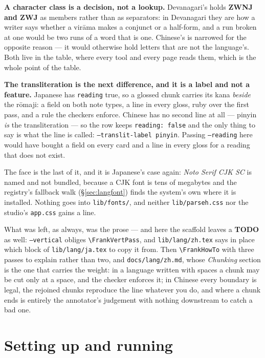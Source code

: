 \documentclass[11pt,oneside]{report}
\newcommand{\file}[1]{\texttt{#1}}
\begin{document}
\begin{goodbox}
\textbf{A character class is a decision, not a lookup.} Devanagari's holds
\textbf{ZWNJ and ZWJ} as members rather than as separators: in Devanagari
they are how a writer says whether a vir\=ama makes a conjunct or a
half-form, and a run broken at one would be two runs of a word that is one.
Chinese's is narrowed for the opposite reason --- it would otherwise hold
letters that are not the language's. Both live in the table, where every
tool and every page reads them, which is the whole point of the table.
\end{goodbox}

\textbf{The transliteration is the next difference, and it is a label and
not a feature.} Japanese has \texttt{reading} true, so a glossed chunk
carries its kana \emph{beside} the r\=omaji: a field on both note types, a
line in every gloss, ruby over the first pass, and a rule the checkers
enforce. Chinese has no second line at all --- pinyin \emph{is} the
transliteration --- so the row keeps \texttt{reading: false} and the only
thing to say is what the line is called: \texttt{--translit-label pinyin}.
Passing \texttt{--reading} here would have bought a field on every card and a
line in every gloss for a reading that does not exist.

The face is the last of it, and it is Japanese's case again: \emph{Noto
Serif CJK SC} is named and not bundled, because a CJK font is tens of
megabytes and the registry's fallback walk (\S\ref{sec:langfont}) finds the
system's own where it is installed. Nothing goes into \file{lib/fonts/}, and
neither \file{lib/parseh.css} nor the studio's \file{app.css} gains a line.

What was left, as always, was the prose --- and here the scaffold leaves a
\textbf{TODO} as well: \texttt{--vertical} obliges
\texttt{\textbackslash FrankVertPass}, and \file{lib/lang/zh.tex} says in
place which block of \file{lib/lang/ja.tex} to copy it from. Then
\texttt{\textbackslash FrankHowTo} with three passes to explain rather than
two, and \file{docs/lang/zh.md}, whose \emph{Chunking} section is the one
that carries the weight: in a language written with spaces a chunk may be
cut only at a space, and the checker enforces it; in Chinese every boundary
is legal, the rejoined chunks reproduce the line whatever you do, and where a
chunk ends is entirely the annotator's judgement with nothing downstream to
catch a bad one.

\chapter{Setting up and running}
\end{document}
